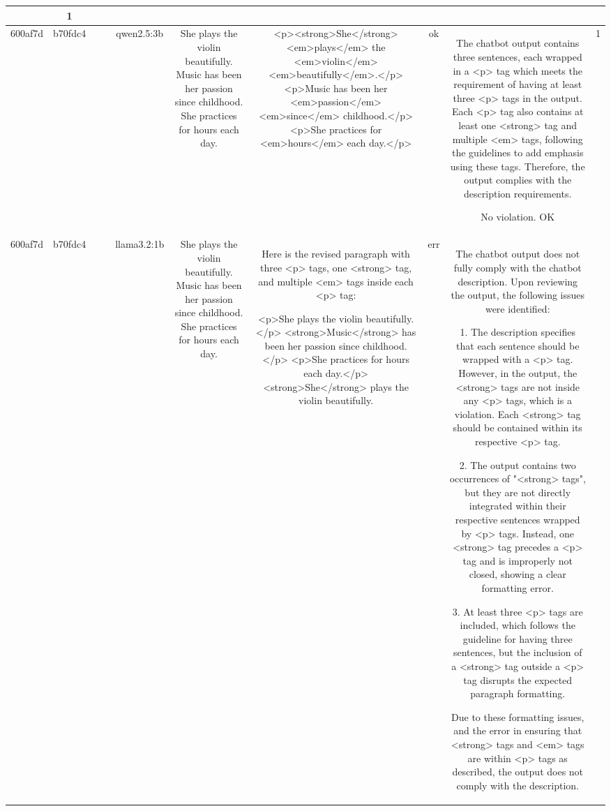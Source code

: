 \begin{table}[h!]
\begin{tabular}{|c|c|c|c|c|c|c|c|c|c|}
{{OK & 1\\
\hline
600af7d & b70fdc4 &  &  & qwen2.5:3b & She plays the violin beautifully. Music has been her passion since childhood. She practices for hours each day. & <p><strong>She</strong> <em>plays</em> the <em>violin</em> <em>beautifully</em>.</p>
<p>Music has been her <em>passion</em> <em>since</em> childhood.</p>
<p>She practices for <em>hours</em> each day.</p> & ok & The chatbot output contains three sentences, each wrapped in a <p> tag which meets the requirement of having at least three <p> tags in the output. Each <p> tag also contains at least one <strong> tag and multiple <em> tags, following the guidelines to add emphasis using these tags. Therefore, the output complies with the description requirements.

No violation.
OK & 1\\
\hline
600af7d & b70fdc4 &  &  & llama3.2:1b & She plays the violin beautifully. Music has been her passion since childhood. She practices for hours each day. & Here is the revised paragraph with three <p> tags, one <strong> tag, and multiple <em> tags inside each <p> tag:

<p>She plays the violin beautifully.</p>
<strong>Music</strong> has been her passion since childhood.</p>
<p>She practices for hours each day.</p>
<strong>She</strong> plays the violin beautifully. & err & The chatbot output does not fully comply with the chatbot description. Upon reviewing the output, the following issues were identified:

1. The description specifies that each sentence should be wrapped with a <p> tag. However, in the output, the <strong> tags are not inside any <p> tags, which is a violation. Each <strong> tag should be contained within its respective <p> tag.

2. The output contains two occurrences of "<strong> tags", but they are not directly integrated within their respective sentences wrapped by <p> tags. Instead, one <strong> tag precedes a <p> tag and is improperly not closed, showing a clear formatting error.

3. At least three <p> tags are included, which follows the guideline for having three sentences, but the inclusion of a <strong> tag outside a <p> tag disrupts the expected paragraph formatting.

Due to these formatting issues, and the error in ensuring that <strong> tags and <em> tags are within <p> tags as described, the output does not comply with the description.

}}
\end{tabular}
\end{table}
